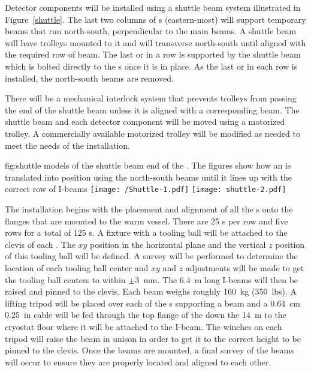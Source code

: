 Detector components will be installed using a shuttle beam system
illustrated in Figure~\ref{shuttle}.  The last two columns of
\fdth{}s (eastern-most) will support temporary beams that run
north-south, perpendicular to the main  beams.  A shuttle
beam
will have trolleys mounted to it and will transverse
north-south until aligned with the required row of  beam.  The last
 or  in a row is supported by the shuttle beam which is bolted
directly to the \fdth{}s once it is in place.  As the last  or
 in each row is installed, the north-south beams are removed.

There will be a mechanical interlock system that prevents trolleys
from passing the end of the shuttle beam unless it is aligned with a
corresponding  beam.  The shuttle beam and each detector component will be
moved using a motorized trolley.  A commercially available motorized
trolley will be modified as needed to meet the needs of the
installation.

\begin{dunefigure}{fig:shuttle}
  {\threed models of the shuttle beam end of the . The figures show how an 
is translated into position using the north-south beams until it lines up with the correct
row of I-beams}
\texttt{[image: /Shuttle-1.pdf]}
 \texttt{[image: shuttle-2.pdf]}
\end{dunefigure}


The  installation begins with the placement and alignment of all
the \fdth{}s onto the flanges that are mounted to the warm vessel.
There are \num{25} \fdth{}s per row and five rows for a total of \num{125}
\fdth{}s.  A fixture with a tooling ball will be attached to the
clevis of each \fdth.  The $xy$ position in the horizontal plane
and the vertical $z$ position of this tooling ball will be defined.  A
survey will be performed to determine the location of each tooling
ball center and $xy$ and $z$ adjustments will be made to get the tooling
ball centers to within $\pm$\SI{3}{mm}.  The \SI{6.4}{m} long I-beams will then be
raised and pinned to the clevis.  Each beam weighs roughly \SI{160}{kg} (\SI{350}{lbs}).
A lifting tripod will be placed over each of the \fdth{}s
supporting a beam and a \SI{0.64}{cm} \SI{0.25}{in}  %
cable will be fed through the top
flange of the \fdth down the \SI{14}{m} to the cryostat floor where it
will be attached to the I-beam.  The winches on each tripod will raise
the beam in unison in order to get it to the correct height to be
pinned to the \fdth clevis.  Once the beams are mounted, a final
survey of the beams will occur to ensure they are properly located and aligned
to each other.

